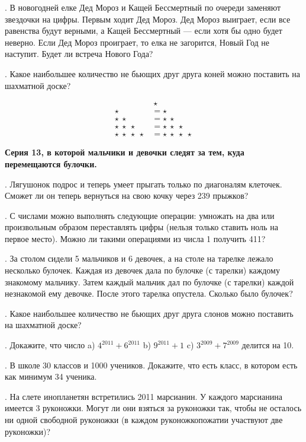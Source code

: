 \noindent\parbox{155truemm}{. В новогодней елке Дед Мороз и Кащей Бессмертный по очереди заменяют
звездочки на цифры. Первым ходит Дед Мороз. Дед Мороз выиграет,
если все равенства будут верными, а Кащей Бессмертный --- если хотя бы одно будет неверно. Если Дед Мороз проиграет, то елка не загорится, Новый
Год не наступит. Будет ли встреча Нового Года?

.  Какое наибольшее количество не бьющих друг друга коней
можно поставить на шахматной доске?
}
\parbox{4cm}{\begin{align*}
&\ \star \\
                      \star&=\star    \\
                     \star\ \star&=\star\ \star   \\
                   \star\ \star\ \star&=\star\ \star\ \star  \\
                  \star\ \star\ \star\ \star&=\star\ \star\ \star\ \star       
     \end{align*}
}






\centerline{\bf Серия 13, в которой мальчики и девочки следят за тем, куда перемещаются булочки.}

. Лягушонок подрос и теперь умеет прыгать только по диагоналям
клеточек. Сможет ли он теперь вернуться на свою кочку через 239 прыжков?

. С числами можно выполнять следующие операции:
умножать на два или произвольным образом переставлять цифры
(нельзя только ставить ноль на первое место).
Можно ли такими операциями из числа 1 получить 411?

.  За столом сидели 5 мальчиков и 6 девочек, а на столе на тарелке
лежало несколько булочек.
Каждая из девочек дала по булочке (с тарелки) каждому знакомому мальчику.
Затем каждый мальчик дал по булочке (с тарелки) каждой незнакомой ему девочке.
После этого тарелка опустела. Сколько было булочек?

. Какое наибольшее количество не бьющих друг друга слонов
можно поставить на шахматной доске?

. Докажите, что число a) $4^{2011}+6^{2011}$ b) $9^{2011}+1$ 
c) $3^{2009}+7^{2009}$ делится на 10.

.  В школе 30 классов и 1000 учеников. Докажите, что есть класс, в котором есть как минимум 34 ученика.

. На слете инопланетян встретились 2011 марсианин. У каждого марсианина
имеется 3 руконожки. Могут ли они взяться за руконожки так, чтобы не осталось
ни одной свободной руконожки (в каждом руконожкопожатии участвуют две
руконожки)?


